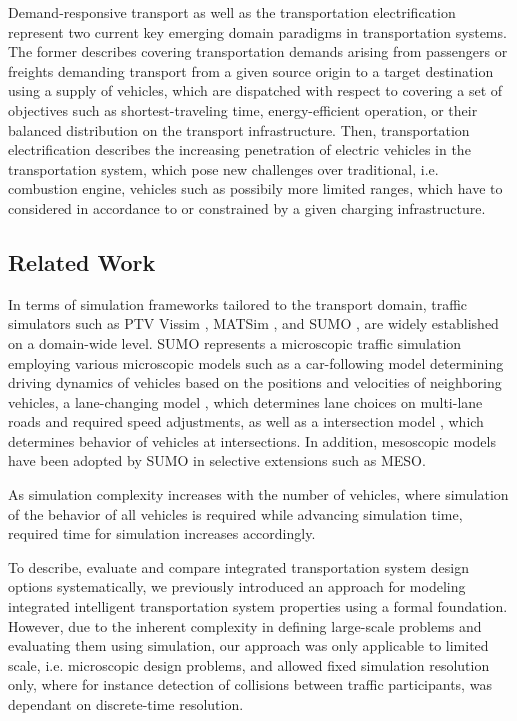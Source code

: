 \documentclass[graybox]{svmult}
\begin{document}
Demand-responsive transport \cite{brake_demand_2004} as well as the transportation electrification \cite{pereirinha2018main} represent two current key emerging domain paradigms in transportation systems. The former describes covering transportation demands arising from passengers or freights demanding transport from a given source origin to a target destination using a supply of vehicles, which are dispatched with respect to covering a set of objectives such as shortest-traveling time, energy-efficient operation, or their balanced distribution on the transport infrastructure. Then, transportation electrification describes the increasing penetration of electric vehicles in the transportation system, which pose new challenges over traditional, i.e. combustion engine, vehicles such as possibily more limited ranges, which have to considered in accordance to or constrained by a given charging infrastructure. 
\vspace{-2mm}

\subsection{Related Work}
In terms of simulation frameworks tailored to the transport domain, traffic simulators such as PTV Vissim \cite{fellendorf_vissim_1994}, MATSim \cite{w_axhausen_multi-agent_2016}, and SUMO \cite{krajzewicz2010traffic}, \cite{lopez_microscopic_2018} are widely established on a domain-wide level. SUMO represents a microscopic traffic simulation employing various microscopic models such as a car-following model \cite{krauss1998microscopic} determining driving dynamics of vehicles based on the positions and velocities of neighboring vehicles, a lane-changing model \cite{erdmann2015sumo}, which determines lane choices on multi-lane roads and required speed adjustments, as well as a intersection model \cite{krajzewicz2013road}, which determines behavior of vehicles at intersections. In addition, mesoscopic models \cite{eissfeldt2004vehicle} have been adopted by SUMO in selective extensions such as MESO.

As simulation complexity increases with the number of vehicles, where simulation of the behavior of all vehicles is required while advancing simulation time, required time for simulation increases accordingly. 

To describe, evaluate and compare integrated transportation system design options systematically, we previously introduced an approach for modeling integrated intelligent transportation system properties using a formal foundation. However, due to the inherent complexity in defining large-scale problems and evaluating them using simulation, our approach was only applicable to limited scale, i.e. microscopic design problems, and allowed fixed simulation resolution only, where for instance detection of collisions between traffic participants, was dependant on discrete-time resolution.  
\end{document}
